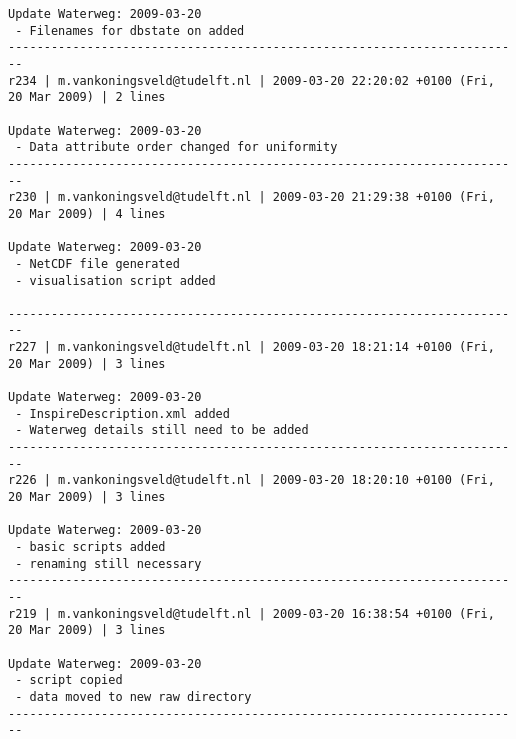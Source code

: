 \documentclass[9]{report}
\begin{document}
\begin{description}
\begin{verbatim}
Update Waterweg: 2009-03-20
 - Filenames for dbstate on added
------------------------------------------------------------------------
r234 | m.vankoningsveld@tudelft.nl | 2009-03-20 22:20:02 +0100 (Fri, 20 Mar 2009) | 2 lines

Update Waterweg: 2009-03-20
 - Data attribute order changed for uniformity
------------------------------------------------------------------------
r230 | m.vankoningsveld@tudelft.nl | 2009-03-20 21:29:38 +0100 (Fri, 20 Mar 2009) | 4 lines

Update Waterweg: 2009-03-20
 - NetCDF file generated
 - visualisation script added

------------------------------------------------------------------------
r227 | m.vankoningsveld@tudelft.nl | 2009-03-20 18:21:14 +0100 (Fri, 20 Mar 2009) | 3 lines

Update Waterweg: 2009-03-20
 - InspireDescription.xml added
 - Waterweg details still need to be added
------------------------------------------------------------------------
r226 | m.vankoningsveld@tudelft.nl | 2009-03-20 18:20:10 +0100 (Fri, 20 Mar 2009) | 3 lines

Update Waterweg: 2009-03-20
 - basic scripts added
 - renaming still necessary
------------------------------------------------------------------------
r219 | m.vankoningsveld@tudelft.nl | 2009-03-20 16:38:54 +0100 (Fri, 20 Mar 2009) | 3 lines

Update Waterweg: 2009-03-20
 - script copied
 - data moved to new raw directory
------------------------------------------------------------------------


\end{verbatim}
\end{description}
\end{document}
